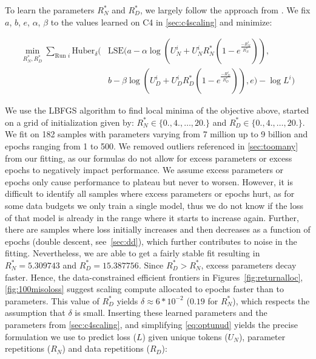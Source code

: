 \documentclass{article}
\begin{document}
To learn the parameters $R_N^*$ and $R_D^*$, we largely follow the approach from \cite{hoffmann2022training}. We fix $a$, $b$, $e$, $\alpha$, $\beta$ to the values learned on C4 in \autoref{sec:c4scaling} and minimize:

\begin{equation}\label{eq:lsedata}
\begin{aligned}
 \min_{R_N^*,R_D^*}  \sum_{\text{Run }i} \text{Huber}_\delta \Big( & \text{LSE}\big(a - \alpha \log (U_N^i + U_N^i R_N^* (1 - e^{\frac{-R_N^i}{R_N^*}})), \\
 & b- \beta \log (U_D^i + U_D^i R_D^* (1 - e^{\frac{-R_D^i}{R_D^*}})), e \big) - \log L^i
 \Big)
\end{aligned}
\end{equation}

We use the LBFGS algorithm to find local minima of the objective above, started on a grid of initialization given by: $R_N^* \in \{0., 4.,\dots, 20. \}$ and $R_D^* \in \{0., 4.,\dots, 20. \}$. We fit on 182 samples with parameters varying from 7 million up to 9 billion and epochs ranging from 1 to 500. We removed outliers referenced in \autoref{sec:toomany} from our fitting, as our formulas do not allow for excess parameters or excess epochs to negatively impact performance. We assume excess parameters or epochs only cause performance to plateau but never to worsen. However, it is difficult to identify all samples where excess parameters or epochs hurt, as for some data budgets we only train a single model, thus we do not know if the loss of that model is already in the range where it starts to increase again. Further, there are samples where loss initially increases and then decreases as a function of epochs (double descent, see~\autoref{sec:dd}), which further contributes to noise in the fitting. Nevertheless, we are able to get a fairly stable fit resulting in $R_N^*=5.309743$ and $R_D^*=15.387756$. Since $R_D^* > R_N^*$, excess parameters decay faster. Hence, the data-constrained efficient frontiers in Figures~\ref{fig:returnalloc},\ref{fig:100misoloss} suggest scaling compute allocated to epochs faster than to parameters. This value of $R_D^*$ yields $\delta \approx 6 * 10^{-2}$ ($0.19$ for $R_N^*$), which respects the assumption that $\delta$ is small. Inserting these learned parameters and the parameters from \autoref{sec:c4scaling}, and simplifying \autoref{eq:optunud} yields the precise formulation we use to predict loss ($L$) given unique tokens ($U_N$), parameter repetitions ($R_N$) and data repetitions ($R_D$): 
\end{document}
